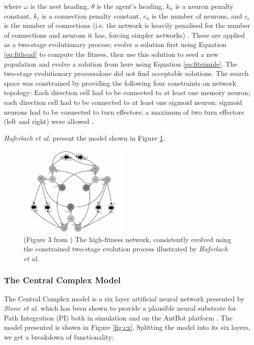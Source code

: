 \documentclass[a4paper,11pt,twoside,openright]{article}
\begin{document}
where $\omega$ is the nest heading, $\theta$ is the agent's heading, $k_n$ is
a neuron penalty constant, $k_c$ is a connection penalty constant, $c_n$ is
the number of neurons, and $c_c$ is the number of connections (i.e.
the network is heavily penalised for the number of connections and neurons it
has, forcing simpler networks) \cite{Haferlach2007}. These are applied as a
two-stage evolutionary process; evolve a solution first using Equation
\ref{eq:fithead} to compute the fitness, then use this solution to seed a new
population and evolve a solution from here using Equation \ref{eq:fitsimple}. The
two-stage evolutionary processalone did not find acceptable solutions. The search
space was constrained by providing the following four constraints on network
topology: Each direction cell had to be connected to at least one memory neuron;
each direction cell had to be connected to at least one sigmoid neuron; sigmoid
neurons had to be connected to turn effectors; a maximum of two turn effectors
(left and right) were allowed \cite{Haferlach2007}.
\newline
\par

\textit{Haferlach et al.} present the model shown in Figure
\ref{fig:evolvednetwork}.

\begin{figure}
  \centering
  \includegraphics[width=0.48\textwidth]{EvolvedNetwork}
  \caption{\label{fig:evolvednetwork} (Figure 3 from \cite{Haferlach2007})
    The high-fitness network, consistently evolved using the constrained
    two-stage evolution process illustrated by \textit{Haferlach et al.}
  }
\end{figure}





\subsubsection{The Central Complex Model}
The Central Complex model is a six layer artificial neural network presented by
\textit{Stone et al.} which has been shown to provide a plausible neural
substrate for Path Integration (PI) both in simulation and on the AntBot platform
\cite{Scimeca2017, Stone2017}. The model presented is shown in Figure
\ref{fig:cx}. Splitting the model into its six layers, we get a breakdown of
functionality:
\newline
\par
\end{document}
